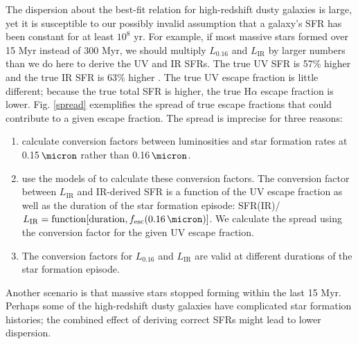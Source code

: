 \documentclass[preprint]{aastex}
\begin{document}
The dispersion about the best-fit relation for high-redshift dusty galaxies
is large, yet it is susceptible
to our possibly invalid assumption that a galaxy's SFR has been
constant for at least $10^{8}$ yr.  For example, if most
massive stars formed over 15 Myr instead of 300 Myr, we should multiply
$L_{0.16}$ and $L_{\mathrm{IR}}$ by larger numbers than we do here to derive the
UV and IR SFRs.  The true UV SFR is 57\% higher and the true IR SFR is 63\%
higher \citep{madau14}.  The true UV escape fraction is little different;
because the true total SFR is higher, the true H$\alpha$ escape fraction is
lower.  Fig. \ref{spread} exemplifies the spread of true escape fractions that
could contribute to a given escape fraction.  The spread is imprecise for three
reasons:
\begin{enumerate}
\item \citet{madau14} calculate conversion factors between luminosities and
star formation rates at 0.15$\,\micron$ rather than 0.16$\,\micron$.
\item \citet{madau14} use the models of \citet{conroy10} to calculate these
conversion factors.  The conversion factor between $L_{\mathrm{IR}}$ and
IR-derived SFR is a function of the UV escape fraction as well as the duration
of the star formation episode: SFR(IR)/$L_{\mathrm{IR}} = \mathrm{function}
[\mathrm{duration}, f_{\mathrm{esc}}(0.16\,\micron)]$.  We calculate the spread
using the conversion factor for the given UV escape fraction.
\item The \citet{kennicutt98} conversion factors for $L_{0.16}$ and
$L_{\mathrm{IR}}$ are valid at different durations of the star formation
episode.
\end{enumerate}
Another scenario is that massive stars stopped forming within the last
15 Myr.  Perhaps some of the high-redshift dusty galaxies have
complicated star formation histories; the combined effect of deriving correct
SFRs might lead to lower dispersion.
\end{document}
